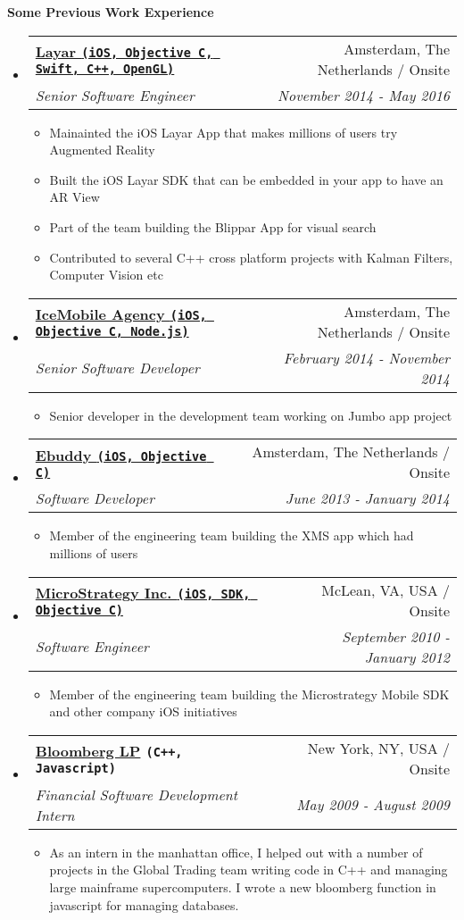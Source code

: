 \documentclass[letterpaper,11pt]{article}
\makeatletter
\newcommand{\resitem}[1]{\item #1 \vspace{-2pt}}
\newcommand{\resheading}[1]{{\large \colorbox{mygrey}{\begin{minipage}{\textwidth}{\textbf{#1 \vphantom{p\^{E}}}}\end{minipage}}}}
\newcommand{\ressubheading}[4]{
\begin{tabular*}{7.0in}{l@{\extracolsep{\fill}}r}
    \textbf{#1} & #2 \\
    \textit{#3} & \textit{#4} \\
\end{tabular*}\vspace{-6pt}}
\makeatother
\begin{document}
\resheading{Some Previous Work Experience}
\begin{itemize}

\item
    \ressubheading{\href{https://www.layar.com/}{Layar  \texttt{(iOS, Objective C, Swift, C++, OpenGL)}}}{Amsterdam, The Netherlands / Onsite}{Senior Software Engineer}{November 2014 - May 2016}
    \begin{itemize}
        \resitem{Mainainted the iOS Layar App that makes millions of users try Augmented Reality}
        \resitem{Built the iOS Layar SDK that can be embedded in your app to have an AR View}
        \resitem{Part of the team building the Blippar App for visual search}
        \resitem{Contributed to several C++ cross platform projects with Kalman Filters, Computer Vision etc}
    \end{itemize}

\item
    \ressubheading{\href{http://www.icemobile.com}{IceMobile Agency \texttt{(iOS, Objective C, Node.js)}}}{Amsterdam, The Netherlands / Onsite}{Senior Software Developer}{February 2014 - November 2014}
    \begin{itemize}
        \resitem{Senior developer in the development team working on Jumbo app project}
    \end{itemize}

\item
    \ressubheading{\href{http://www.ebuddy.com}{Ebuddy \texttt{(iOS, Objective C)}}}{Amsterdam, The Netherlands / Onsite}{Software Developer}{June 2013 - January 2014}
    \begin{itemize}
        \resitem{Member of the engineering team building the XMS app which had millions of users}
    \end{itemize}

\item
    \ressubheading{\href{http://www.microstrategy.com/Company}{MicroStrategy Inc. \texttt{(iOS, SDK, Objective C)}}}{McLean, VA, USA / Onsite}{Software Engineer}{September 2010 - January 2012}
    \begin{itemize}
        \resitem{Member of the engineering team building the Microstrategy Mobile SDK and other company iOS initiatives}
    \end{itemize}
    
\item
    \ressubheading{\href{http://www.bloomberg.com}{Bloomberg LP} \texttt{(C++, Javascript)}}{New York, NY, USA / Onsite}{Financial Software Development Intern}{May 2009 - August 2009}
    \begin{itemize}
      \resitem{As an intern in the manhattan office, I helped out with a number of projects in the Global Trading team writing code in C++ and managing large mainframe supercomputers. I wrote a new bloomberg function in javascript for managing databases.}
    \end{itemize}
    
    
\end{itemize}
\end{document}
